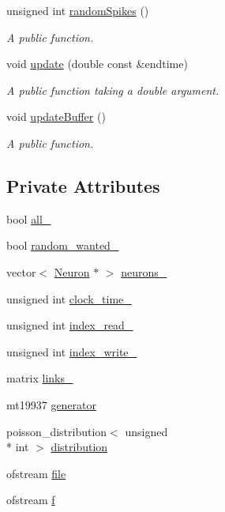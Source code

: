\begin{DoxyCompactItemize}
unsigned int \hyperlink{classNetwork_a37bbf43b2a9a494c83fe89069d6b8af3}{random\-Spikes} ()
\begin{DoxyCompactList}\small\item\em A public function. \end{DoxyCompactList}\item 
void \hyperlink{classNetwork_a3f434b2e65713f94664623e845f18317}{update} (double const \&endtime)
\begin{DoxyCompactList}\small\item\em A public function taking a double argument. \end{DoxyCompactList}\item 
void \hyperlink{classNetwork_a683728dac1747ff9605bc1884b46ad0d}{update\-Buffer} ()
\begin{DoxyCompactList}\small\item\em A public function. \end{DoxyCompactList}\end{DoxyCompactItemize}
\subsection*{Private Attributes}
\begin{DoxyCompactItemize}
\item 
bool \hyperlink{classNetwork_a4ae561779053e1b5be2422cb3170417a}{all\-\_\-}
\item 
bool \hyperlink{classNetwork_a4e092c1d6ac94d836db8cc21987cea8b}{random\-\_\-wanted\-\_\-}
\item 
vector$<$ \hyperlink{classNeuron}{Neuron} $\ast$ $>$ \hyperlink{classNetwork_a6f71e4eb423d2f8fd9cfa8d5f01cb257}{neurons\-\_\-}
\item 
unsigned int \hyperlink{classNetwork_a18d3152b3b67965689cb9aa2241eea60}{clock\-\_\-time\-\_\-}
\item 
unsigned int \hyperlink{classNetwork_a2deae5cc2b7c3805d4073902f66a2a5d}{index\-\_\-read\-\_\-}
\item 
unsigned int \hyperlink{classNetwork_a1ad1c1f7a31dc2e5215d5032d539c238}{index\-\_\-write\-\_\-}
\item 
matrix \hyperlink{classNetwork_a62673362a51ee5efe3663f324e6624a2}{links\-\_\-}
\item 
mt19937 \hyperlink{classNetwork_ad347753a95a50caf5c7df6798587b68f}{generator}
\item 
poisson\-\_\-distribution$<$ unsigned \\*
int $>$ \hyperlink{classNetwork_a8bf522b67910db2becace84c61e24336}{distribution}
\item 
ofstream \hyperlink{classNetwork_a92dc3befe6139a49991f2457d81884e1}{file}
\item 
ofstream \hyperlink{classNetwork_a278c3f19603f68ef1bd0b6e52f04d2db}{f}
\end{DoxyCompactItemize}


